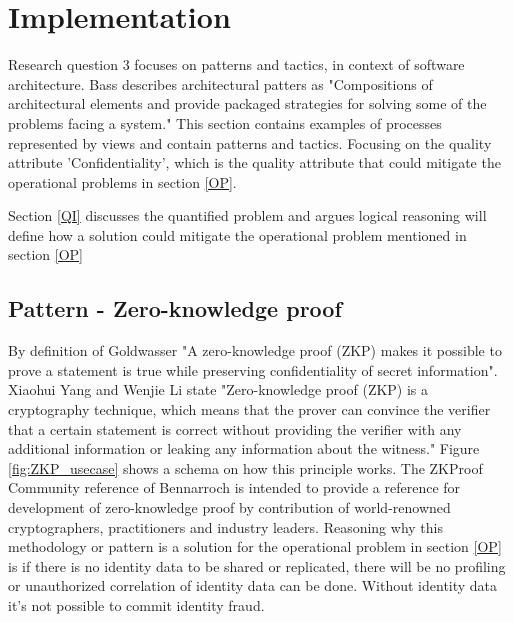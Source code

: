 \chapter{Implementation}\label{s:Implementation}
Research question 3 focuses on patterns and tactics, in context of software architecture. Bass \etal \cite{Bass2015SoftwareAI} describes architectural patters as "Compositions of architectural elements and provide packaged strategies for solving some of the problems facing a system." This section contains examples of processes represented by views and contain patterns and tactics. Focusing on the quality attribute 'Confidentiality', which is the quality attribute that could mitigate the operational problems in section \ref{OP}. 

Section \ref{QI} discusses the quantified problem and argues logical reasoning will define how a solution could mitigate the operational problem mentioned in section \ref{OP}
\section{Pattern - Zero-knowledge proof}
By definition of Goldwasser \etal \cite{Goldwasser} "A zero-knowledge proof (ZKP) makes it possible to prove a statement is true while preserving confidentiality of secret information". 
Xiaohui Yang and Wenjie Li \cite{YANG2020102050} state "Zero-knowledge proof (ZKP) is a cryptography technique, which means that the prover can convince the verifier that a certain statement is correct without providing the verifier with any additional information or leaking any information about the witness." Figure \ref{fig:ZKP_usecase} shows a schema on how this principle works. The ZKProof Community reference \cite{2019:zkproof:community-reference-0.2} of Bennarroch \etal is intended to provide a reference for development of zero-knowledge proof by contribution of world-renowned cryptographers, practitioners and industry leaders.
Reasoning why this methodology or pattern is a solution for the operational problem in section \ref{OP} is if there is no identity data to be shared or replicated, there will be no profiling or unauthorized correlation of identity data can be done. Without identity data it's not possible to commit identity fraud.

